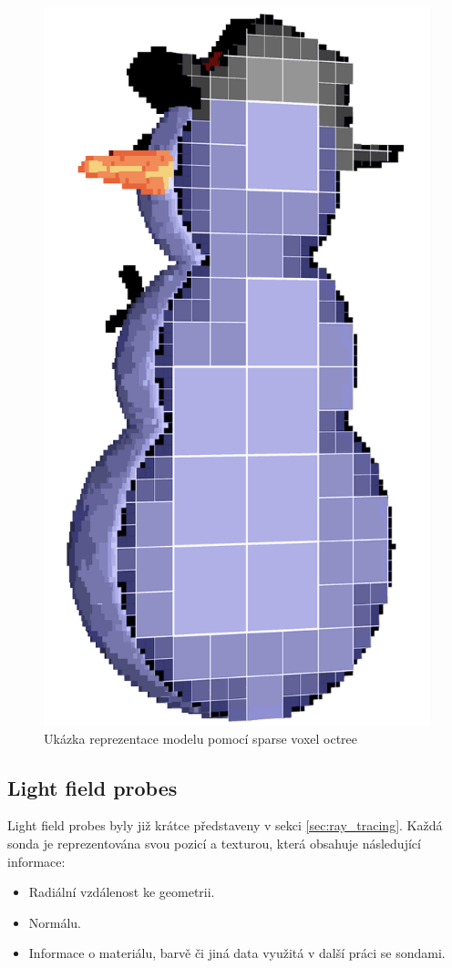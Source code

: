 \begin{figure}[H]
	\centering
	\includegraphics[scale=0.2]{obrazky-figures/svo_snowman.png}
	\caption{Ukázka reprezentace modelu pomocí sparse voxel octree}
	\label{fig:svo_example}
\end{figure}

\subsection{Light field probes}\label{sec:lfp_design}
Light field probes byly již krátce představeny v sekci \ref{sec:ray_tracing}. Každá sonda je reprezentována svou pozicí a texturou, která obsahuje následující informace:
\begin{itemize}
 \item Radiální vzdálenost ke geometrii.
 \item Normálu.
 \item Informace o materiálu, barvě či jiná data využitá v další práci se sondami.
\end{itemize}

